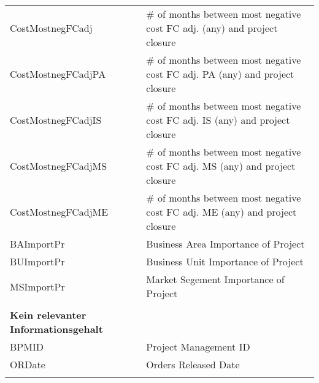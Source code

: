 \begin{longtable}[ht]{p{} p{}}
		CostMostnegFCadj & \# of months between most negative cost FC adj. (any) and project closure \\
		CostMostnegFCadjPA & \# of months between most negative cost FC adj. PA (any) and project closure \\
		CostMostnegFCadjIS & \# of months between most negative cost FC adj. IS (any) and project closure \\
		CostMostnegFCadjMS & \# of months between most negative cost FC adj. MS (any) and project closure \\
		CostMostnegFCadjME & \# of months between most negative cost FC adj. ME (any) and project closure \\
		BAImportPr & Business Area Importance of Project \\
		BUImportPr & Business Unit Importance of Project \\
		MSImportPr & Market Segement Importance  of Project \\
		&\\
		\textbf{Kein relevanter Informationsgehalt} & \\\hline
		BPMID & Project Management ID \\
		ORDate & Orders Released Date \\
	\label{tab:addlabel}%
\end{longtable}%
\newpage
